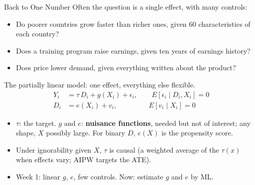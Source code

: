 \documentclass[aspectratio=169,11pt,xcolor=dvipsnames]{beamer}
\newcommand{\E}{E}
\begin{document}
\begin{frame}{Back to One Number}
Often the question is a single effect, with many controls:
\begin{itemize}\itemsep3pt
  \item Do poorer countries grow faster than richer ones, given 60 characteristics of each
        country?
  \item Does a training program raise earnings, given ten years of earnings history?
  \item Does price lower demand, given everything written about the product?
\end{itemize}
\vskip3pt
The \alert{partially linear model}: one effect, everything else flexible.
\begin{align*}
  Y_i &= \tau\, D_i + g(X_i) + \epsilon_i, \qquad \E[\epsilon_i \mid D_i, X_i] = 0 \\
  D_i &= e(X_i) + v_i, \qquad\qquad\ \ \E[v_i \mid X_i] = 0
\end{align*}
\vskip-2pt
\begin{itemize}\itemsep3pt
  \item $\tau$: the target. $g$ and $e$: \textbf{nuisance functions}, needed but not of interest;
        any shape, $X$ possibly large. For binary $D$, $e(X)$ is the propensity score.
  \item Under ignorability given $X$, $\tau$ is causal (a weighted average of the $\tau(x)$
        when effects vary; AIPW targets the ATE).
  \item Week 1: linear $g$, $e$, few controls. Now: estimate $g$ and $e$ by ML.
\end{itemize}
\end{frame}
\end{document}
